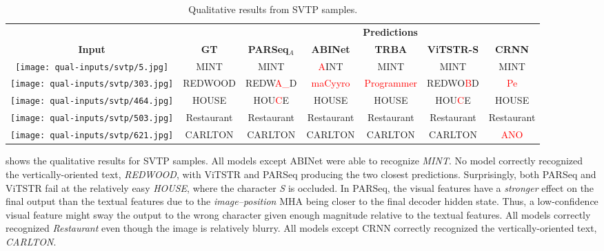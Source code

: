 \begin{table*}[htbp]
  \centering
  \scriptsize
  \setlength\tabcolsep{3pt}
  \caption{Qualitative results from SVTP samples.}
  \begin{tabular}{ c c c c c c c }
    \toprule
    & & \multicolumn{5}{c}{\textbf{Predictions}} \\
    \cmidrule{3-7}
    \textbf{Input} & \textbf{GT} & \textbf{PARSeq$_A$} & \textbf{ABINet} & \textbf{TRBA} & \textbf{ViTSTR-S} & \textbf{CRNN} \\
    \midrule
    \texttt{[image: qual-inputs/svtp/5.jpg]} & MINT & MINT & \textcolor{red}{A}INT & MINT & MINT & MINT \\
    \texttt{[image: qual-inputs/svtp/303.jpg]} & REDWOOD & REDW\textcolor{red}{A\_}D & \textcolor{red}{maCyyro} & \textcolor{red}{Programmer} & REDWO\textcolor{red}{B}D & \textcolor{red}{Pe} \\
    \texttt{[image: qual-inputs/svtp/464.jpg]} & HOUSE & HOU\textcolor{red}{C}E & HOUSE & HOUSE & HOU\textcolor{red}{C}E & HOUSE \\
    \texttt{[image: qual-inputs/svtp/503.jpg]} & Restaurant & Restaurant & Restaurant & Restaurant & Restaurant & Restaurant \\
    \texttt{[image: qual-inputs/svtp/621.jpg]} & CARLTON & CARLTON & CARLTON & CARLTON & CARLTON & \textcolor{red}{ANO} \\
    \bottomrule
  \end{tabular}
  \label{tab:qual-results-svtp}
\end{table*}

 shows the qualitative results for SVTP samples. All models except ABINet were able to recognize \textit{MINT}. No model correctly recognized the vertically-oriented text, \textit{REDWOOD}, with ViTSTR and PARSeq producing the two closest predictions. Surprisingly, both PARSeq and ViTSTR fail at the relatively easy \textit{HOUSE}, where the character \textit{S} is occluded. In PARSeq, the visual features have a \textit{stronger} effect on the final output than the textual features due to the \textit{image--position} MHA being closer to the final decoder hidden state. Thus, a low-confidence visual feature might sway the output to the wrong character given enough magnitude relative to the textual features. All models correctly recognized \textit{Restaurant} even though the image is relatively blurry. All models except CRNN correctly recognized the vertically-oriented text, \textit{CARLTON}.

